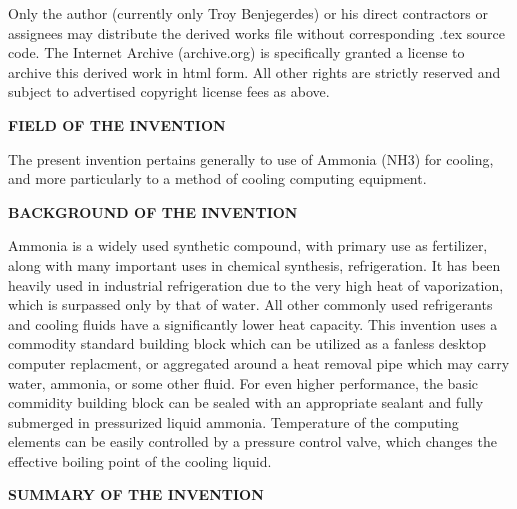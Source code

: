 \documentclass[times]{article}
\begin{document}
Only the author (currently only Troy Benjegerdes) or his direct contractors or 
assignees may distribute the derived works file without corresponding .tex source
code. The Internet Archive (archive.org) is specifically granted a license to archive
this derived work in html form. All other rights are strictly reserved and subject
to advertised copyright license fees as above.

\begin{center}
{\bf FIELD OF THE INVENTION}
\end{center}

   The present invention pertains generally to use of Ammonia (NH3) for cooling,
and more particularly to a method of cooling computing equipment.

\begin{center}
{\bf BACKGROUND OF THE INVENTION}
\end{center}

   Ammonia is a widely used synthetic compound, with primary use as fertilizer,
along with many important uses in chemical synthesis, refrigeration. It has been
heavily used in industrial refrigeration due to the very high heat of vaporization,
which is surpassed only by that of water. All other commonly used refrigerants and
cooling fluids have a significantly lower heat capacity. This invention uses a 
commodity standard building block which can be utilized as a fanless desktop computer
replacment, or aggregated around a heat removal pipe which may carry water, ammonia,
or some other fluid. For even higher performance, the basic commidity building block
can be sealed with an appropriate sealant and fully submerged in pressurized liquid
ammonia. Temperature of the computing elements can be easily controlled by a pressure
control valve, which changes the effective boiling point of the cooling liquid.


\begin{center}
{\bf SUMMARY OF THE INVENTION}
\end{center}




\end{document}
